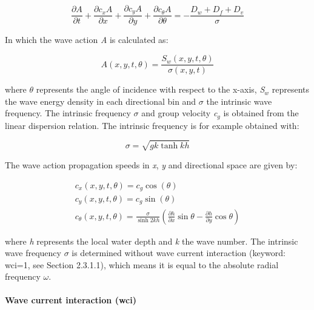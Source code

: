 \documentclass{article}
\begin{document}
\noindent 
\begin{equation} \label{ZEqnNum871591} 
\frac{\partial A}{\partial t} +\frac{\partial c_{x} A}{\partial x} +\frac{\partial c_{y} A}{\partial y} +\frac{\partial c_{\theta } A}{\partial \theta } =-\frac{D_{w} +D_{f} +D_{v} }{\sigma }  
\end{equation} 


\noindent In which the wave action \textit{A} is calculated as:

  
\begin{equation} \label{2.2)} 
A(x,y,t,\theta )=\frac{S_{w} (x,y,t,\theta )}{\sigma (x,y,t)}  
\end{equation} 


\noindent where \textit{$\theta $} represents the angle of incidence with respect to the x-axis, \textit{S${}_{w}$} represents the wave energy density in each directional bin and \textit{$\sigma $} the intrinsic wave frequency. The intrinsic frequency \textit{$\sigma $} and group velocity \textit{c${}_{g}$} is obtained from the linear dispersion relation. The intrinsic frequency is for example obtained with:

\noindent 
\begin{equation} \label{2.3)} 
\sigma =\sqrt{gk\tanh kh}  
\end{equation} 


\noindent The wave action propagation speeds in \textit{x}, \textit{y} and directional space are given by:

\noindent 
\begin{equation} \label{2.4)} 
\begin{array}{l} {c_{x} (x,y,t,\theta )=c_{g} \cos (\theta )} \\ {c_{y} (x,y,t,\theta )=c_{g} \sin (\theta )} \\ {c_{\theta } (x,y,t,\theta )=\frac{\sigma }{\sinh 2kh} \left(\frac{\partial h}{\partial x} \sin \theta -\frac{\partial h}{\partial y} \cos \theta \right)} \end{array} 
\end{equation} 


\noindent where \textit{h} represents the local water depth and \textit{k} the wave number. The intrinsic wave frequency $\sigma $ is determined without wave current interaction (keyword: wci=1, see Section 2.3.1.1), which means it is equal to the absolute radial frequency $\omega $.


\paragraph{ Wave current interaction (wci)}
\end{document}
